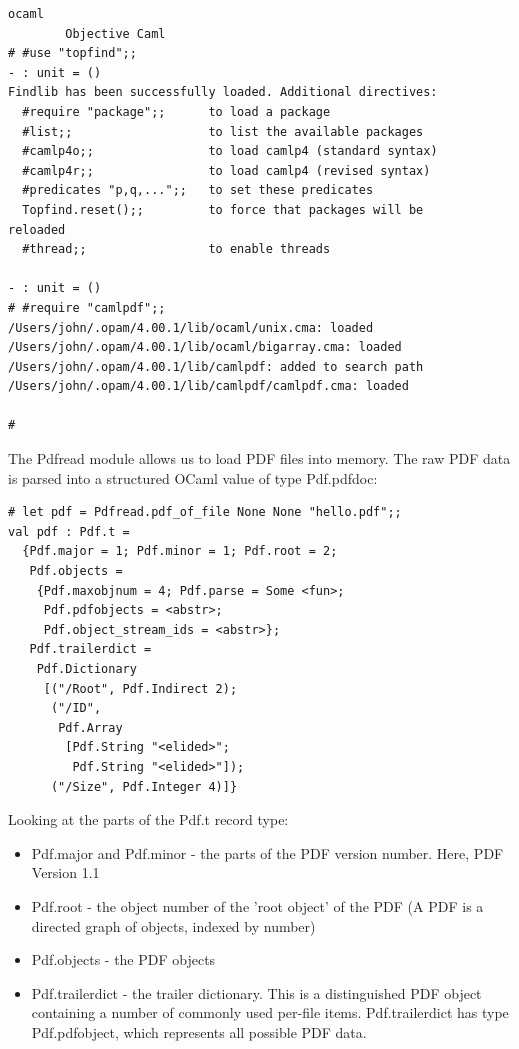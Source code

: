 \documentclass[a4paper]{memoir}
\begin{document}
\begin{framed}
\begin{verbatim}
ocaml
        Objective Caml
# #use "topfind";;
- : unit = ()
Findlib has been successfully loaded. Additional directives:
  #require "package";;      to load a package
  #list;;                   to list the available packages
  #camlp4o;;                to load camlp4 (standard syntax)
  #camlp4r;;                to load camlp4 (revised syntax)
  #predicates "p,q,...";;   to set these predicates
  Topfind.reset();;         to force that packages will be
reloaded
  #thread;;                 to enable threads

- : unit = ()
# #require "camlpdf";;
/Users/john/.opam/4.00.1/lib/ocaml/unix.cma: loaded
/Users/john/.opam/4.00.1/lib/ocaml/bigarray.cma: loaded
/Users/john/.opam/4.00.1/lib/camlpdf: added to search path
/Users/john/.opam/4.00.1/lib/camlpdf/camlpdf.cma: loaded

#
\end{verbatim}
\end{framed}
\noindent The \textsf{Pdfread} module allows us to load PDF files into memory. The raw PDF data is parsed into a structured OCaml value of type \textsf{Pdf.pdfdoc}:
\begin{framed}
\begin{verbatim}
# let pdf = Pdfread.pdf_of_file None None "hello.pdf";;
val pdf : Pdf.t =
  {Pdf.major = 1; Pdf.minor = 1; Pdf.root = 2;
   Pdf.objects =
    {Pdf.maxobjnum = 4; Pdf.parse = Some <fun>;
     Pdf.pdfobjects = <abstr>;
     Pdf.object_stream_ids = <abstr>};
   Pdf.trailerdict =
    Pdf.Dictionary
     [("/Root", Pdf.Indirect 2);
      ("/ID",
       Pdf.Array
        [Pdf.String "<elided>";
         Pdf.String "<elided>"]);
      ("/Size", Pdf.Integer 4)]}
\end{verbatim}
\end{framed}
\noindent Looking at the parts of the \textsf{Pdf.t} record type:
\begin{itemize}
\item \textsf{Pdf.major} and \textsf{Pdf.minor} - the parts of the PDF version number. Here, PDF Version 1.1
\item \textsf{Pdf.root} - the object number of the 'root object' of the PDF (A PDF is a directed graph of objects, indexed by number)
\item \textsf{Pdf.objects} - the PDF objects
\item \textsf{Pdf.trailerdict} - the trailer dictionary. This is a distinguished PDF object containing a number of commonly used per-file items. \textsf{Pdf.trailerdict} has type \textsf{Pdf.pdfobject}, which represents all possible PDF data.
\end{itemize}
\end{document}
